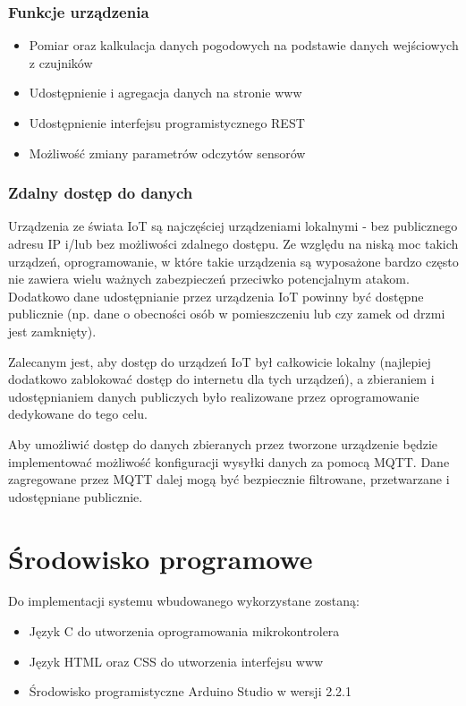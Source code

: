 \documentclass[12pt,a4paper]{article}
\begin{document}
\subsubsection{Funkcje urządzenia}
\begin{itemize}
    \item Pomiar oraz kalkulacja danych pogodowych na podstawie danych wejściowych z czujników
    \item Udostępnienie i agregacja danych na stronie www
    \item Udostępnienie interfejsu programistycznego REST
    \item Możliwość zmiany parametrów odczytów sensorów
\end{itemize}

\subsubsection{Zdalny dostęp do danych}

Urządzenia ze świata IoT są najczęściej urządzeniami lokalnymi - bez publicznego adresu IP i/lub bez możliwości zdalnego dostępu.
Ze względu na niską moc takich urządzeń, oprogramowanie, w które takie urządzenia są wyposażone bardzo często nie zawiera 
wielu ważnych zabezpieczeń przeciwko potencjalnym atakom. Dodatkowo dane udostępnianie przez urządzenia IoT powinny być dostępne publicznie 
(np. dane o obecności osób w pomieszczeniu lub czy zamek od drzmi jest zamknięty). 

Zalecanym jest, aby dostęp do urządzeń IoT był całkowicie lokalny (najlepiej dodatkowo zablokować dostęp do internetu dla tych urządzeń),
a zbieraniem i udostępnianiem danych publiczych było realizowane przez oprogramowanie dedykowane do tego celu.

Aby umożliwić dostęp do danych zbieranych przez tworzone urządzenie będzie implementować możliwość konfiguracji wysyłki danych za pomocą MQTT.
Dane zagregowane przez MQTT dalej mogą być bezpiecznie filtrowane, przetwarzane i udostępniane publicznie.

\section{Środowisko programowe}
Do implementacji systemu wbudowanego wykorzystane zostaną:
\begin{itemize}
    \item Język C do utworzenia oprogramowania mikrokontrolera
    \item Język HTML oraz CSS do utworzenia interfejsu www
    \item Środowisko programistyczne Arduino Studio w wersji 2.2.1
\end{itemize}
\end{document}
